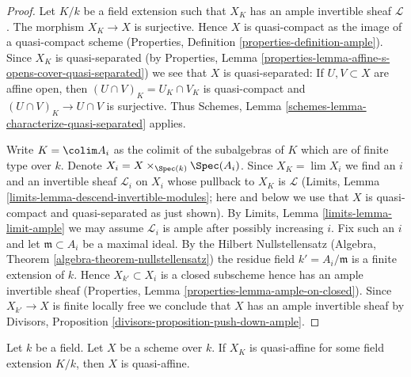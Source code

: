 \begin{proof}
Let $K/k$ be a field extension such that $X_K$ has
an ample invertible sheaf $\mathcal{L}$.
The morphism $X_K \to X$ is surjective. Hence $X$ is quasi-compact
as the image of a quasi-compact scheme (Properties, Definition
\ref{properties-definition-ample}). Since $X_K$ is quasi-separated
(by Properties, Lemma
\ref{properties-lemma-affine-s-opens-cover-quasi-separated})
we see that $X$ is quasi-separated: If $U, V \subset X$ are
affine open, then $(U \cap V)_K = U_K \cap V_K$ is quasi-compact
and $(U \cap V)_K \to U \cap V$ is surjective. Thus
Schemes, Lemma \ref{schemes-lemma-characterize-quasi-separated} applies.

\medskip\noindent
Write $K = \colim A_i$ as the colimit of the subalgebras of $K$
which are of finite type over $k$. Denote
$X_i = X \times_{\Spec(k)} \Spec(A_i)$.
Since $X_K = \lim X_i$ we find an $i$ and an invertible sheaf
$\mathcal{L}_i$ on $X_i$ whose pullback to $X_K$ is $\mathcal{L}$
(Limits, Lemma \ref{limits-lemma-descend-invertible-modules};
here and below we use that $X$ is quasi-compact and quasi-separated as
just shown). By Limits, Lemma \ref{limits-lemma-limit-ample}
we may assume $\mathcal{L}_i$ is ample after possibly increasing $i$.
Fix such an $i$ and let $\mathfrak m \subset A_i$ be a maximal
ideal. By the Hilbert Nullstellensatz
(Algebra, Theorem \ref{algebra-theorem-nullstellensatz})
the residue field $k' = A_i/\mathfrak m$ is a finite
extension of $k$. Hence $X_{k'} \subset X_i$ is a closed subscheme
hence has an ample invertible sheaf
(Properties, Lemma \ref{properties-lemma-ample-on-closed}).
Since $X_{k'} \to X$ is finite locally free we conclude
that $X$ has an ample invertible sheaf by
Divisors, Proposition \ref{divisors-proposition-push-down-ample}.
\end{proof}

\begin{lemma}
\label{lemma-quasi-affine-after-field-extension}
Let $k$ be a field. Let $X$ be a scheme over $k$. If $X_K$ is quasi-affine
for some field extension $K/k$, then $X$ is quasi-affine.
\end{lemma}

